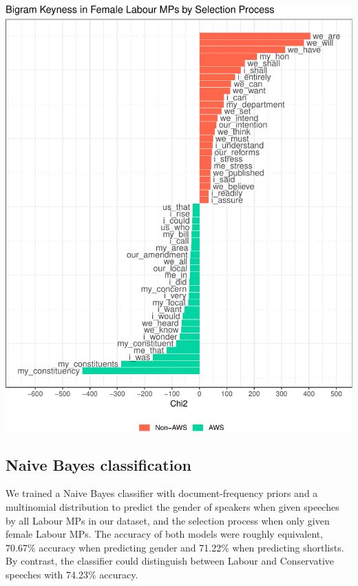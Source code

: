 \documentclass[]{article}
\let\origfigure\figure
\let\endorigfigure\endfigure
\renewenvironment{figure}[1][2] {
    \expandafter\origfigure\expandafter[H]
} {
    \endorigfigure
}
\begin{document}
\begin{figure}
\centering
\includegraphics{methodology_files/figure-latex/bigrams-short-list-keyness-1.pdf}
\caption{\label{bigrams-keyness}Bigram Keyness in Female Labour MPs by
Selection Process}
\end{figure}

\hypertarget{naive-bayes-classification}{%
\subsection{Naive Bayes
classification}\label{naive-bayes-classification}}

We trained a Naive Bayes classifier with document-frequency priors and a
multinomial distribution to predict the gender of speakers when given
speeches by all Labour MPs in our dataset, and the selection process
when only given female Labour MPs. The accuracy of both models were
roughly equivalent, 70.67\% accuracy when predicting gender and 71.22\%
when predicting shortlists. By contrast, the classifier could
distinguish between Labour and Conservative speeches with 74.23\%
accuracy.
\end{document}
